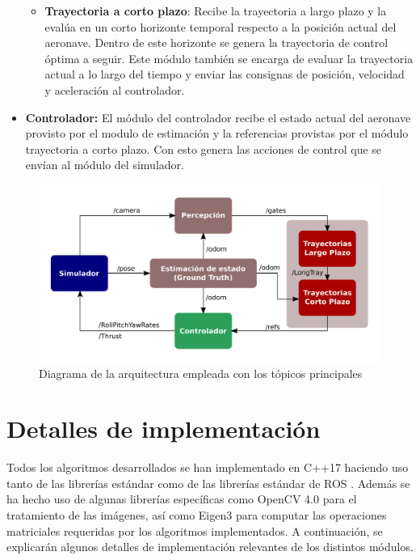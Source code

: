 \begin{itemize}
\begin{itemize}
		\item \textbf{Trayectoria a corto plazo}: Recibe la trayectoria a largo plazo y la evalúa en un corto horizonte temporal respecto a la posición actual del aeronave. Dentro de este horizonte se genera la trayectoria de control óptima a seguir. Este módulo también se encarga de evaluar la trayectoria actual a lo largo del tiempo y enviar las consignas de posición, velocidad y aceleración al controlador.
	\end{itemize}
	
	\item \textbf{Controlador:} El módulo del controlador recibe el estado actual del aeronave provisto por el modulo de estimación y la referencias provistas por el módulo trayectoria a corto plazo. Con esto genera las acciones de control que se envían al módulo del simulador.
	
\end{itemize}

\begin{figure}[htb!]
	\centering
	\includegraphics[width=\textwidth]{imagenes/Arquitectura}
	\caption{Diagrama de la arquitectura empleada con los tópicos principales}
	\label{Arquitectura}
\end{figure}


\section{Detalles de implementación}

Todos los algoritmos desarrollados se han implementado en C++17 haciendo uso tanto de las librerías estándar como de las librerías estándar de ROS . Además se ha hecho uso de algunas librerías específicas como OpenCV 4.0 para el tratamiento de las imágenes, así como Eigen3 para computar las operaciones matriciales requeridas por los algoritmos implementados. A continuación, se explicarán algunos detalles de implementación relevantes de los distintos módulos.

